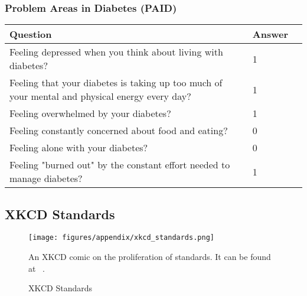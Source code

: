 \subsubsection{Problem Areas in Diabetes (PAID)}
\begin{table}[H]
    \centering
    \renewcommand{\arraystretch}{1.2}
    \begin{tabularx}{\textwidth}{|l|X|l|}
        \hline
        \textbf{Question} & \textbf{Answer} \\ \hline
        Feeling depressed when you think about living with diabetes? &
        1
        \\ \hline
        Feeling that your diabetes is taking up too much of your mental and physical energy every day? &
        1
        \\ \hline
        Feeling overwhelmed by your diabetes? &
        1
        \\ \hline
        Feeling constantly concerned about food and eating? &
        0
        \\ \hline
        Feeling alone with your diabetes? &
        0
        \\ \hline
        Feeling "burned out" by the constant effort needed to manage diabetes? &
        1
        \\ \hline
    \end{tabularx}
\end{table}


\subsection{XKCD Standards}\label{sec:XKCD-standards}
\begin{figure}[H]
    \centering
    \texttt{[image: figures/appendix/xkcd\_standards.png]}
    \caption{XKCD Standards}
    \medskip
    \small
    \raggedright
    An XKCD comic on the proliferation of standards. It can be found at ~\cite{XKCD-standards}.
    \label{fig:XKCD-standards}
\end{figure}
